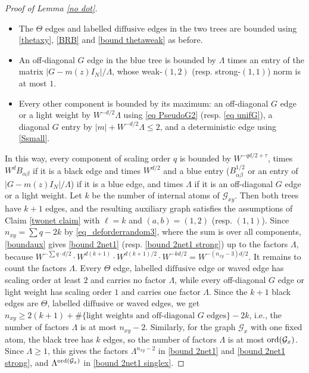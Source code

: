 \documentclass{article}
\newcommand{\1}{\mathds{1}}
\numberwithin{equation}{section}
\newcommand{\ord}{{\rm{ord}}}
\newcommand{\al}{\alpha}
\renewcommand{\cal}{\mathcal}
\renewcommand{\leq}{\leqslant}
\renewcommand{\geq}{\geqslant}
\renewcommand{\le}{\leq}
\renewcommand{\ge}{\geq}
\newcommand{\dashed}{\text{diffusive}}
\theoremstyle{plain} %
\theoremstyle{remark}
\begin{document}
\begin{proof} [Proof of Lemma \ref{no dot}]
\begin{itemize}
\item The $\Theta$ edges and labelled $\dashed$ edges in the two trees are bounded using \eqref{thetaxy}, \eqref{BRB} and \eqref{bound thetaweak} as before.

\item An off-diagonal $G$ edge in the blue tree is bounded by $\Lambda$ times an entry of the matrix $|G-m(z)I_N|/\Lambda$, whose weak-$(1,2)$ (resp. strong-$(1,1)$) norm is at most $1$.

\item Every other component is bounded by its maximum: an off-diagonal $G$ edge or a light weight by $W^{-d/2}\Lambda$ using \eqref{eq PseudoG2} (resp. \eqref{eq unifG}), a diagonal $G$ entry by $|m|+W^{-d/2}\Lambda\le 2$, and a deterministic edge using \eqref{Ssmall}.
\end{itemize}
In this way, every component of scaling order $q$ is bounded by $W^{-qd/2+\tau}$, times $W^d B_{\al\beta}$ if it is a black edge and times $W^{d/2}$ and a blue entry ($B^{1/2}_{\al\beta}$ or an entry of $|G-m(z)I_N|/\Lambda$) if it is a blue edge, and times $\Lambda$ if it is an off-diagonal $G$ edge or a light weight. Let $k$ be the number of internal atoms of $\cal G_{xy}$. Then both trees have $k+1$ edges, and the resulting auxiliary graph satisfies the assumptions of Claim \ref{twonet claim} with $\ell=k$ and $(a,b)=(1,2)$ (resp. $(1,1)$). Since $n_{xy}=\sum q-2k$ by \eqref{eq_deforderrandom3}, where the sum is over all components, \eqref{boundaux} gives \eqref{bound 2net1} (resp. \eqref{bound 2net1 strong}) up to the factors $\Lambda$, because $W^{-\sum q\cdot d/2}\cdot W^{d(k+1)}\cdot W^{d(k+1)/2}\cdot W^{-kd/2}=W^{-(n_{xy}-3)d/2}$. It remains to count the factors $\Lambda$. Every $\Theta$ edge, labelled $\dashed$ edge or waved edge has scaling order at least $2$ and carries no factor $\Lambda$, while every off-diagonal $G$ edge or light weight has scaling order $1$ and carries one factor $\Lambda$. Since the $k+1$ black edges are $\Theta$, labelled $\dashed$ or waved edges, we get $n_{xy}\ge 2(k+1)+\#\{\text{light weights and off-diagonal $G$ edges}\}-2k$, i.e., the number of factors $\Lambda$ is at most $n_{xy} -2$. Similarly, for the graph $\cal G_x$ with one fixed atom, the black tree has $k$ edges, so the number of factors $\Lambda$ is at most $\ord(\cal G_x)$. Since $\Lambda\ge 1$, this gives the factors $\Lambda^{n_{xy}-2}$ in \eqref{bound 2net1} and \eqref{bound 2net1 strong}, and $\Lambda^{\ord(\cal G_x)}$ in \eqref{bound 2net1 singlex}.

\end{proof}
\end{document}
